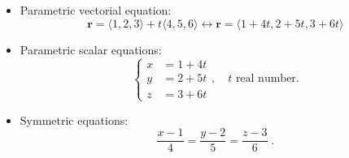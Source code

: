 \begin{frame}


\begin{itemize}
 \item<4-> Parametric vectorial equation:
%
$$\textbf{r} = \langle 1,2,3\rangle + t \langle 4,5,6\rangle \leftrightarrow
\textbf{r} = \langle 1+4t, 2+5t, 3+6t\rangle$$
%
\item<5-> Parametric scalar equations:
%
$$\left\{ \begin{array}{ll}
           x & = 1 + 4t \\
	   y & = 2+5t \\
           z & = 3+6t
          \end{array}
\right. , \quad t \text{ real number.}$$
%
\item<6-> Symmetric equations:
%
$$\frac{x-1}{4} = \frac{y-2}{5} = \frac{z-3}{6}\; .$$
\end{itemize}

\end{frame}

